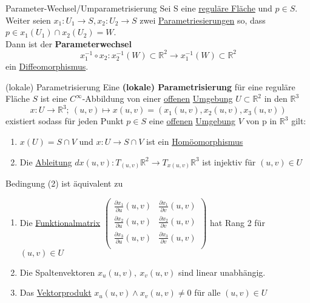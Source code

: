 \begin{titleDef}{Parameter-Wechsel/Umparametrisierung}
\label{paraWechsel}
Sei S eine \hyperref[regFlaeche]{reguläre Fläche} und $p\in S$. Weiter seien $x_1:U_1\to S, x_2:U_2\to S$ zwei \hyperref[parametrisierung]{Parametriesierungen} so, dass $p\in x_1(U_1)\cap x_2(U_2)=W$.\\
Dann ist der \textbf{Parameterwechsel} 
$$x_1^{-1}\circ x_2:x_2^{-1}(W)\subset\mathbb{R}^2\to x_1^{-1}(W)\subset\mathbb{R}^2$$
ein \hyperref[diffeomorph]{Diffeomorphismus}.
\end{titleDef}

\begin{titleDef}{(lokale) Parametrisierung}
\label{parametrisierung}
Eine \textbf{(lokale) Parametrisierung} für eine reguläre Fläche $S$ ist eine $C^\infty$-Abbildung von einer \hyperref[offen]{offenen} \hyperref[Umgebung]{Umgebung} $U\subset \mathbb{R}^2$ in den $\mathbb{R}^3$
$$x:U\to\mathbb{R}^3;\: (u,v)\mapsto x(u,v)=(x_1(u,v),x_2(u,v),x_3(u,v))$$
existiert sodass für jeden Punkt $p\in S$ eine \hyperref[offen]{offenen} \hyperref[Umgebung]{Umgebung} $V$ von p in $\mathbb{R}^3$ gilt:
\begin{enumerate}[label=(\arabic*)]
	\item $x(U)=S\cap V$ und $x:U\to S\cap V$ ist ein \hyperref[homoemorph]{Homöomorphismus} 
	\item Die \hyperref[differenzial]{Ableitung} $dx(u,v):T_{(u,v)}\mathbb{R}^2\to T_{x(u,v)}\mathbb{R}^3$ ist injektiv für $(u,v)\in U$
\end{enumerate}
Bedingung (2) ist äquivalent zu
\begin{enumerate}[label=(2\alph*)]
	\item Die \hyperref[funktmatrix]{Funktionalmatrix} $\begin{pmatrix}
		\frac{\partial x_1}{\partial u}(u,v)&\frac{\partial x_1}{\partial v}(u,v)\\
		\frac{\partial x_2}{\partial u}(u,v)&\frac{\partial x_2}{\partial v}(u,v)\\
		\frac{\partial x_3}{\partial u}(u,v)&\frac{\partial x_3}{\partial v}(u,v)\\
	\end{pmatrix}$ hat Rang 2 für $(u,v)\in U$
	\item Die Spaltenvektoren $x_u(u,v),\ x_v(u,v)$ sind linear unabhängig.
	\item Das \hyperref[vektorprodukt]{Vektorprodukt} $x_u(u,v)\wedge x_v(u,v)\neq0$ für alle $(u,v)\in U$
\end{enumerate}
\end{titleDef}

